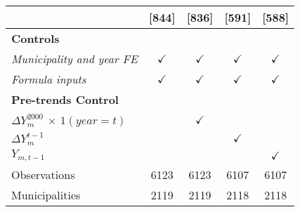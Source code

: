 \begin{tabular}{lcccc}
\vspace{4pt} &  \footnotesize{[844]} &
				\footnotesize{[836]} &
				\footnotesize{[591]} &
				\footnotesize{[588]} \\
			
\midrule
{\bf Controls}    					&	   &   
										   & 
										   & 
										   \\


\textit{Municipality and year FE}    &	$\checkmark$   &   
										$\checkmark$   & 
										$\checkmark$   & 
										$\checkmark$   \\

\textit{Formula inputs}  	& 	$\checkmark$    &   
								$\checkmark$    & 
								$\checkmark$    & 
								$\checkmark$    \\


{\bf Pre-trends Control}       &	   &   
									   & 
									   &
									   \\


\textit{$\Delta Y^{2000}_m$ $\times$ $1(year=t)$}  & 	
												   & $\checkmark$	
												   & 
												   & \\


\textit{$\Delta Y^{t-1}_m$} 						&	
													&   
													& $\checkmark$	
													& \\

\textit{$Y_{m,t-1}$}  								&
													& 
													& 
													& $\checkmark$	\\

\midrule		


Observations 			&	 6123   &   
							 6123   & 
							 6107   & 
							 6107   \\

Municipalities  		&    2119   &   
							 2119   & 
							 2118   & 
							 2118   \\

\bottomrule

\end{tabular}%
